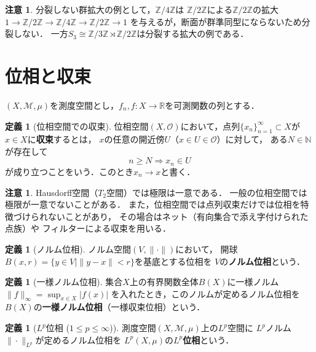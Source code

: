 \documentclass[dvipdfmx,a4paper,12pt]{jsarticle}
\theoremstyle{definition}
\newtheorem{definition}[theorem]{定義}
\newtheorem{remark}[theorem]{注意}
\begin{document}
\begin{remark}
    分裂しない群拡大の例として，$\mathbb{Z}/4\mathbb{Z}$は
    $\mathbb{Z}/2\mathbb{Z}$による$\mathbb{Z}/2\mathbb{Z}$の拡大
    $1\to\mathbb{Z}/2\mathbb{Z}\to\mathbb{Z}/4\mathbb{Z}\to\mathbb{Z}/2\mathbb{Z}\to 1$
    を与えるが，断面が群準同型にならないため分裂しない．
    一方$S_3\cong\mathbb{Z}/3\mathbb{Z}\rtimes\mathbb{Z}/2\mathbb{Z}$は分裂する拡大の例である．
\end{remark}


\section{位相と収束}

$(X,\mathcal{M},\mu)$を測度空間とし，$f_n,f\colon X\to\mathbb{R}$を可測関数の列とする．

\begin{definition}[位相空間での収束]
    位相空間$(X,\mathcal{O})$において，点列$\{x_n\}_{n=1}^\infty\subset X$が
    $x\in X$に\textbf{収束}するとは，
    $x$の任意の開近傍$U$（$x\in U\in\mathcal{O}$）に対して，
    ある$N\in\mathbb{N}$が存在して
    $$n\geq N\Rightarrow x_n\in U$$
    が成り立つことをいう．このとき$x_n\to x$と書く．
\end{definition}

\begin{remark}
    Hausdorff空間（$T_2$空間）では極限は一意である．
    一般の位相空間では極限が一意でないことがある．
    また，位相空間では点列収束だけでは位相を特徴づけられないことがあり，
    その場合はネット（有向集合で添え字付けられた点族）や
    フィルターによる収束を用いる．
\end{remark}

\begin{definition}[ノルム位相]
    ノルム空間$(V,\|\cdot\|)$において，
    開球$B(x,r)=\{y\in V\mid \|y-x\|<r\}$を基底とする位相を
    $V$の\textbf{ノルム位相}という．
\end{definition}

\begin{definition}[一様ノルム位相]
    集合$X$上の有界関数全体$B(X)$に一様ノルム
    $\|f\|_\infty=\sup_{x\in X}|f(x)|$
    を入れたとき，このノルムが定めるノルム位相を
    $B(X)$の\textbf{一様ノルム位相}（一様収束位相）という．
\end{definition}

\begin{definition}[$L^p$位相 ($1\leq p\leq\infty$)]
    測度空間$(X,\mathcal{M},\mu)$上の$L^p$空間に
    $L^p$ノルム$\|\cdot\|_{L^p}$が定めるノルム位相を
    $L^p(X,\mu)$の\textbf{$L^p$位相}という．
\end{definition}
\end{document}
